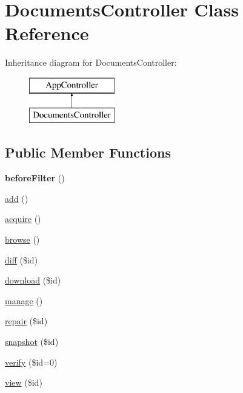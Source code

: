 \hypertarget{classDocumentsController}{
\section{\-Documents\-Controller \-Class \-Reference}
\label{classDocumentsController}
}
\-Inheritance diagram for \-Documents\-Controller\-:\begin{figure}[H]
\begin{center}
\leavevmode
\includegraphics[height=2.000000cm]{classDocumentsController}
\end{center}
\end{figure}
\subsection*{\-Public \-Member \-Functions}
\begin{DoxyCompactItemize}
\item 
\hypertarget{classDocumentsController_ad4618f5bb5b8b51833956621b0071907}{
{\bfseries before\-Filter} ()}
\label{classDocumentsController_ad4618f5bb5b8b51833956621b0071907}

\item 
\hyperlink{classDocumentsController_ae9358b6908585ca36b92aa78afb657db}{add} ()
\item 
\hyperlink{classDocumentsController_ac01e57a9403d02d740e6e4fcce3e709b}{acquire} ()
\item 
\hyperlink{classDocumentsController_abe74e68167dd907c1e8428e399e10211}{browse} ()
\item 
\hyperlink{classDocumentsController_a44c8129ba74009effeaf9aa7add0d01f}{diff} (\$id)
\item 
\hyperlink{classDocumentsController_a5b77d80b7b2393a2b03202a9a50e02d7}{download} (\$id)
\item 
\hyperlink{classDocumentsController_acef7de0607f6c433bde6f1515e37d32f}{manage} ()
\item 
\hyperlink{classDocumentsController_a063eb26a98ab07696b2cde69f5c6a7f4}{repair} (\$id)
\item 
\hyperlink{classDocumentsController_a6ac7ef3b7865c256095065313cd7a87d}{snapshot} (\$id)
\item 
\hyperlink{classDocumentsController_adee0e3f5d87ba2bbc74a30ab4934bab7}{verify} (\$id=0)
\item 
\hyperlink{classDocumentsController_ad68485643e01e97a96f077d535865f05}{view} (\$id)
\end{DoxyCompactItemize}
